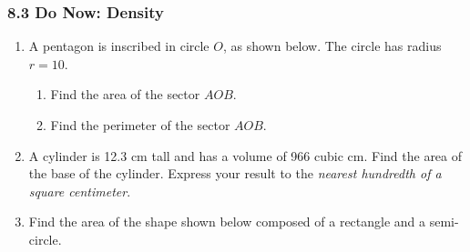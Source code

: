 \documentclass[12pt, twoside]{article}
\begin{document}
\subsubsection*{8.3 Do Now: Density}
 \begin{enumerate}

  \item A pentagon is inscribed in circle $O$, as shown below. The circle has radius $r=10$.
    \begin{multicols}{2}
    \raggedcolumns
    \begin{enumerate}
      \item Find the area of the sector $AOB$. \vspace{3cm}
      \item Find the perimeter of the sector $AOB$. %
    \end{enumerate}
    \end{multicols}  \vspace{1cm}

  \item A cylinder is 12.3 cm tall and has a volume of 966 cubic cm. Find the area of the base of the cylinder. Express your result to the \emph{nearest hundredth of a square centimeter}. \vspace{3cm}

  \item Find the area of the shape shown below composed of a rectangle and a semi-circle.
  \begin{flushright}
\end{flushright}


\end{enumerate}
\end{document}
